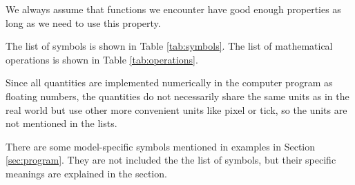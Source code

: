 \documentclass[12pt]{article}
\begin{document}
We always assume that functions we encounter have good enough properties as long as we need to use this property.

The list of symbols is shown in Table \ref{tab:symbols}.
The list of mathematical operations is shown in Table \ref{tab:operations}.

Since all quantities are implemented numerically in the computer program as floating numbers,
the quantities do not necessarily share the same units as in the real world
but use other more convenient units like pixel or tick,
so the units are not mentioned in the lists.

There are some model-specific symbols mentioned in examples in Section \ref{sec:program}.
They are not included the the list of symbols, but their specific meanings are explained in the section.
\end{document}
